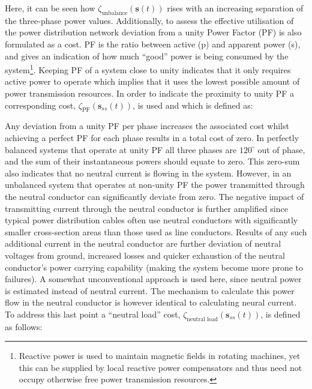 


Here, it can be seen how $\zeta_\text{unbalance}(\textbf{s}(t))$ rises with an increasing separation of the three-phase power values.
Additionally, to assess the effective utilisation of the power distribution network deviation from a unity Power Factor (PF) is also formulated as a cost.
PF is the ratio between active (p) and apparent power (s), and gives an indication of how much ``good'' power is being consumed by the system\footnote{Reactive power is used to maintain magnetic fields in rotating machines, yet this can be supplied by local reactive power compensators and thus need not occupy otherwise free power transmission resources.}.
Keeping PF of a system close to unity indicates that it only requires active power to operate which implies that it uses the lowest possible amount of power transmission resources.
In order to indicate the proximity to unity PF a corresponding cost, $\zeta_\text{PF}(\textbf{s}_{ss}(t))$, is used and which is defined as:




Any deviation from a unity PF per phase increases the associated cost whilst achieving a perfect PF for each phase results in a total cost of zero.
In perfectly balanced systems that operate at unity PF all three phases are $120^\circ$ out of phase, and the sum of their instantaneous powers should equate to zero.
This zero-sum also indicates that no neutral current is flowing in the system.
However, in an unbalanced system that operates at non-unity PF the power transmitted through the neutral conductor can significantly deviate from zero.
The negative impact of transmitting current through the neutral conductor is further amplified since typical power distribution cables often use neutral conductors with significantly smaller cross-section areas than those used as line conductors.
Results of any such additional current in the neutral conductor are further deviation of neutral voltages from ground, increased losses and quicker exhaustion of the neutral conductor's power carrying capability (making the system become more prone to failures).
A somewhat unconventional approach is used here, since neutral power is estimated instead of neutral current.
The mechanism to calculate this power flow in the neutral conductor is however identical to calculating neural current.
To address this last point a ``neutral load'' cost, $\zeta_\text{neutral load}(\textbf{s}_{ss}(t))$, is defined as follows:

